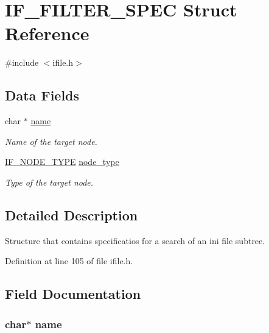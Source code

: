 \hypertarget{struct_i_f___f_i_l_t_e_r___s_p_e_c}{\section{I\-F\-\_\-\-F\-I\-L\-T\-E\-R\-\_\-\-S\-P\-E\-C Struct Reference}
\label{struct_i_f___f_i_l_t_e_r___s_p_e_c}
}


{\ttfamily \#include $<$ifile.\-h$>$}

\subsection*{Data Fields}
\begin{DoxyCompactItemize}
\item 
char $\ast$ \hyperlink{struct_i_f___f_i_l_t_e_r___s_p_e_c_a5ac083a645d964373f022d03df4849c8}{name}
\begin{DoxyCompactList}\small\item\em Name of the target node. \end{DoxyCompactList}\item 
\hyperlink{ifile_8h_aa33acc5a78166e20ede739b43311bc56}{I\-F\-\_\-\-N\-O\-D\-E\-\_\-\-T\-Y\-P\-E} \hyperlink{struct_i_f___f_i_l_t_e_r___s_p_e_c_a34ffe3d3db8e7b7cece8b906af93eabc}{node\-\_\-type}
\begin{DoxyCompactList}\small\item\em Type of the target node. \end{DoxyCompactList}\end{DoxyCompactItemize}


\subsection{Detailed Description}
Structure that contains specificatios for a search of an ini file subtree. 

Definition at line 105 of file ifile.\-h.



\subsection{Field Documentation}
\hypertarget{struct_i_f___f_i_l_t_e_r___s_p_e_c_a5ac083a645d964373f022d03df4849c8}{
\subsubsection[{name}]{\setlength{\rightskip}{0pt plus 5cm}char$\ast$ name}}\label{struct_i_f___f_i_l_t_e_r___s_p_e_c_a5ac083a645d964373f022d03df4849c8}


